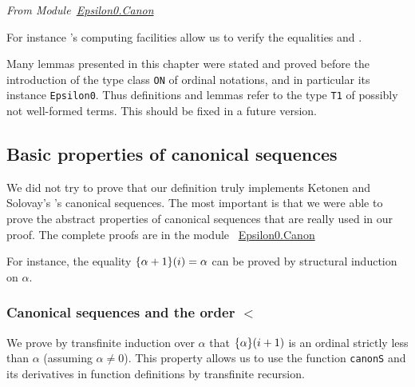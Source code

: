 \vspace{4pt}
\emph{From Module~\href{../theories/html/hydras.Epsilon0.Canon.html\#canon}{Epsilon0.Canon}}

\label{Functions:canonS}
\label{Functions:canon}





For instance \coq's computing facilities allow us to verify the equalities\linebreak 
{} and
.



\begin{project}
Many lemmas presented in this chapter were stated and proved before the introduction of 
the type class \texttt{ON} of ordinal notations, and in particular its  instance \texttt{Epsilon0}.
Thus definitions and lemmas refer to the type \texttt{T1} of possibly not well-formed terms.
This should be fixed in  a future version.
\end{project}


\subsection{Basic properties of canonical sequences}

We did not  try to prove that our definition truly implements Ketonen and Solovay's  \cite{KS81}'s canonical sequences. The most important is that we were able to prove the 
abstract properties  of canonical sequences that are really used in our proof. The complete proofs are in the module
~\href{../theories/html/hydras.Epsilon0.Canon.html}{Epsilon0.Canon}

For instance, the equality $\mbox{$\{\alpha+1\}(i)$}=\alpha$  can be  proved by  structural induction on $\alpha$.




\subsubsection{Canonical sequences and the order $<$}


We prove by transfinite induction over $\alpha$ that $\mbox{$\{\alpha\}(i+1)$}$ is an ordinal strictly less than $\alpha$ (assuming $\alpha\not=0$). This property allows us to use the function \texttt{canonS} and its derivatives in function definitions by transfinite recursion.

